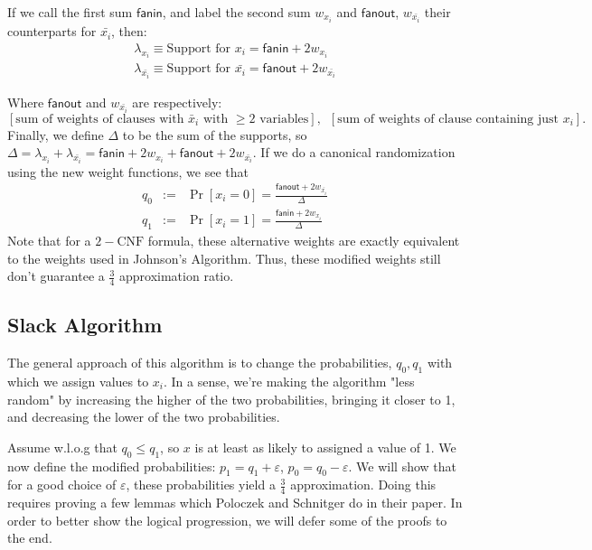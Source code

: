 \documentclass[11pt,letter]{article}
\numberwithin{theorem}{section}
\begin{document}
If we call the first sum $\mathsf{fanin}$, and label the second sum $w_{x_i}$ and $\mathsf{fanout}$, $w_{\bar{x_i}}$ their counterparts for $\bar{x_i}$, then:
\begin{eqnarray*}
\lambda_{x_i} \equiv \textrm{Support for } x_i = \mathsf{fanin} + 2w_{x_i}\\
\lambda_{\bar{x_i}} \equiv \textrm{Support for } \bar{x_i} = \mathsf{fanout} + 2w_{\bar{x_i}}
\end{eqnarray*}

Where $\mathsf{fanout}$ and $w_{\bar{x_i}}$ are respectively: \[[\textrm{sum of weights of clauses with }\bar{x}_i\textrm{ with }\ge 2\textrm{ variables}] ,\,\,\, [\textrm{sum of weights of clause containing just }x_i].\]
Finally, we define $\Delta$ to be the sum of the supports, so $\Delta = \lambda_{x_i} + \lambda_{\bar{x_i}} = \mathsf{fanin} + 2w_{x_i} + \mathsf{fanout} + 2w_{\bar{x_i}}$. If we do a canonical randomization  using the new weight functions, we see that
\begin{eqnarray*}
q_0 &:=& \Pr[x_i=0] = \frac{\mathsf{fanout} + 2w_{\bar{x_i}}}{\Delta}\\
q_1 &:=& \Pr[x_i=1] = \frac{\mathsf{fanin} + 2w_{x_i}}{\Delta}
\end{eqnarray*}
Note that for a $2-\text{CNF}$ formula, these alternative weights are exactly equivalent to the weights used in Johnson's Algorithm. Thus, these modified weights still don't guarantee a $\frac{3}{4}$ approximation ratio.

\subsection*{Slack Algorithm}
The general approach of this algorithm is to change the probabilities, $q_0, q_1$ with which we assign values to $x_i$. In a sense, we're making the algorithm "less random" by increasing the higher of the two probabilities, bringing it closer to 1, and decreasing the lower of the two probabilities.

Assume w.l.o.g that $q_0 \le q_1$, so $x$ is at least as likely to assigned a value of 1. We now define the modified probabilities: $p_1 = q_1 + \varepsilon$, $p_0 = q_0 - \varepsilon$. We will show that for a good choice of $\varepsilon$, these probabilities yield a $\frac{3}{4}$ approximation. Doing this requires proving a few lemmas which Poloczek and Schnitger do in their paper. In order to better show the logical progression, we will defer some of the proofs to the end.
\end{document}
